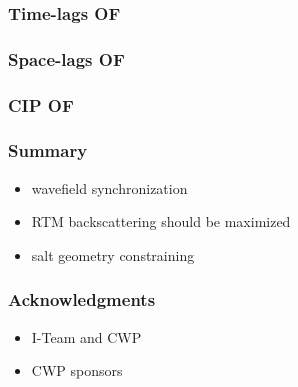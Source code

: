 \begin{frame}\frametitle{Time-lags OF}
\end{frame}

\begin{frame}\frametitle{Space-lags OF}
\end{frame}

\begin{frame}\frametitle{CIP OF}
\end{frame}



\begin{frame}\end{frame}

\begin{frame}\end{frame}

\begin{frame} 
\end{frame}
\begin{frame} 
\end{frame}
\begin{frame} 
\end{frame}

\begin{frame} \frametitle{Summary}
\begin{itemize}
    \item wavefield synchronization
    \item RTM backscattering should be maximized
    \item salt geometry constraining 
\end{itemize}
\end{frame}


\begin{frame} \frametitle{Acknowledgments}
    \begin{itemize}
    \item I-Team and CWP
    \item CWP sponsors
    \end{itemize}
\end{frame}

\begin{frame}\end{frame}


